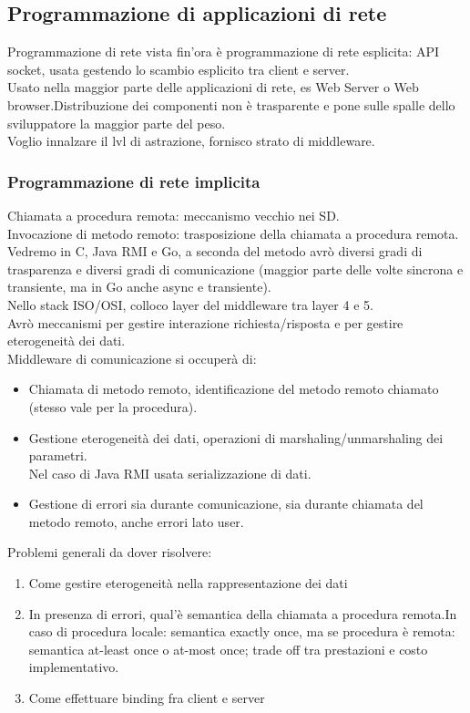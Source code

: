 \documentclass{article}
\begin{document}
\subsection{Programmazione di applicazioni di rete}
Programmazione di rete vista fin'ora è programmazione di rete esplicita: API socket, usata gestendo lo scambio esplicito tra client e server.\\Usato nella maggior parte delle applicazioni di rete, es Web Server o Web browser.Distribuzione dei componenti non è trasparente e pone sulle spalle dello sviluppatore la maggior parte del peso.\\Voglio innalzare il lvl di astrazione, fornisco strato di middleware.
\subsubsection{Programmazione di rete implicita}
Chiamata a procedura remota: meccanismo vecchio nei SD.\\
Invocazione di metodo remoto: trasposizione della chiamata a procedura remota.\\
Vedremo in C, Java RMI e Go, a seconda del metodo avrò diversi gradi di trasparenza e diversi gradi di comunicazione (maggior parte delle volte sincrona e transiente, ma in Go anche async e transiente).\\Nello stack ISO/OSI, colloco layer del middleware tra layer 4 e 5.\\ Avrò meccanismi per gestire interazione richiesta/risposta e per gestire eterogeneità dei dati.\\
Middleware di comunicazione si occuperà di:
\begin{itemize}
\item Chiamata di metodo remoto, identificazione del metodo remoto chiamato (stesso vale per la procedura).
\item Gestione eterogeneità dei dati, operazioni di marshaling/unmarshaling dei parametri.\\ Nel caso di Java RMI usata serializzazione di dati.
\item Gestione di errori sia durante comunicazione, sia durante chiamata del metodo remoto, anche errori lato user.
\end{itemize}
Problemi generali da dover risolvere:
\begin{enumerate}
\item Come gestire eterogeneità nella rappresentazione dei dati
\item In presenza di errori, qual'è semantica della chiamata a procedura remota.In caso di procedura locale: semantica exactly once, ma se procedura è remota: semantica at-least once o at-most once; trade off tra prestazioni e costo implementativo.
\item Come effettuare binding fra client e server
\end{enumerate}
\end{document}
